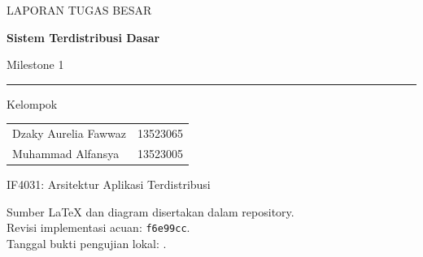 \begin{titlepage}
\centering
\vspace*{12mm}
{\color{Teal}\large LAPORAN TUGAS BESAR}\par
\vspace{5mm}
{\color{Navy}\Huge\bfseries Sistem Terdistribusi Dasar}\par
\vspace{5mm}
{\Large Milestone 1}\par
\vspace{10mm}
{\LARGE\bfseries\SystemName}\par
\vspace{4mm}
\rule{0.75\linewidth}{0.5pt}\par
\vspace{12mm}
{\Large Kelompok \textbf{\GroupName}}\par
\vspace{8mm}
\begin{tabular}{ll}
Dzaky Aurelia Fawwaz & 13523065\\[3mm]
Muhammad Alfansya & 13523005
\end{tabular}
\vfill
{\large IF4031: Arsitektur Aplikasi Terdistribusi}\par
\vspace{3mm}
{\ReportDate}\par
\vspace{8mm}
{\small Sumber LaTeX dan diagram disertakan dalam repository.\\
Revisi implementasi acuan: \texttt{f6e99cc}.\\
Tanggal bukti pengujian lokal: \EvidenceDate.}
\end{titlepage}

